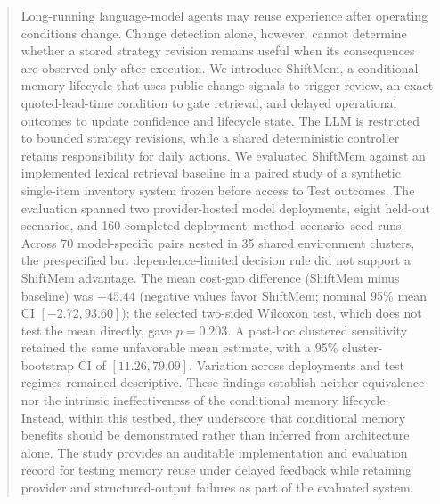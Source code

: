 \begin{abstract}
Long-running language-model agents may reuse experience after operating
conditions change. Change detection alone, however, cannot determine whether a
stored strategy revision remains useful when its consequences are observed only
after execution. We introduce ShiftMem, a conditional memory lifecycle that uses
public change signals to trigger review, an exact quoted-lead-time condition to
gate retrieval, and delayed operational outcomes to update confidence and
lifecycle state. The LLM is restricted to bounded strategy revisions, while a
shared deterministic controller retains responsibility for daily actions. We
evaluated ShiftMem against an implemented lexical retrieval baseline in a paired
study of a synthetic single-item inventory system frozen before access to Test
outcomes. The evaluation spanned two provider-hosted model deployments, eight
held-out scenarios, and 160 completed deployment--method--scenario--seed runs.
Across 70 model-specific pairs nested in 35 shared environment clusters, the
prespecified but dependence-limited decision rule did
not support a ShiftMem advantage. The mean cost-gap difference (ShiftMem minus
baseline) was $+45.44$ (negative values favor ShiftMem; nominal 95\% mean CI
$[-2.72,93.60]$); the selected two-sided Wilcoxon test, which does not test the
mean directly, gave $p=0.203$. A post-hoc clustered sensitivity retained the
same unfavorable mean estimate, with a 95\% cluster-bootstrap CI of
$[11.26,79.09]$. Variation across deployments and test regimes remained
descriptive. These findings establish neither equivalence nor the intrinsic
ineffectiveness of the conditional memory lifecycle. Instead, within this
testbed, they underscore that conditional memory benefits should be demonstrated rather than
inferred from architecture alone. The study provides an auditable implementation
and evaluation record for testing memory reuse under delayed feedback while
retaining provider and structured-output failures as part of the evaluated
system.
\end{abstract}

